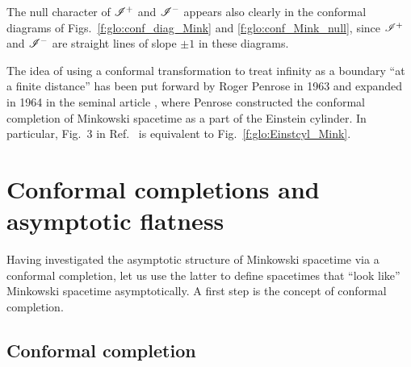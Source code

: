 The null character of $\mathscr{I}^+$ and $\mathscr{I}^-$ appears also clearly in
the conformal diagrams of Figs.~\ref{f:glo:conf_diag_Mink}
and \ref{f:glo:conf_Mink_null}, since
$\mathscr{I}^+$ and $\mathscr{I}^-$ are straight lines of slope $\pm 1$ in these diagrams.


\begin{hist}
The idea of using a conformal transformation to treat infinity as a boundary
``at a finite distance'' has been put forward by Roger Penrose
in 1963 \cite{Penro63} and expanded in 1964 in the seminal article \cite{Penro64},
where Penrose constructed the
conformal completion of Minkowski spacetime as a part of the Einstein cylinder.
In particular, Fig.~3 in Ref.~\cite{Penro64} is equivalent to Fig.~\ref{f:glo:Einstcyl_Mink}.
\end{hist}



\section{Conformal completions and asymptotic flatness} \label{s:glo:conf_compl}

Having investigated the asymptotic structure of Minkowski spacetime
via a conformal completion, let us use the latter to define spacetimes
that ``look like'' Minkowski spacetime asymptotically.
A first step is the concept of conformal completion.

\subsection{Conformal completion} \label{s:glo:def_conf_compl}

